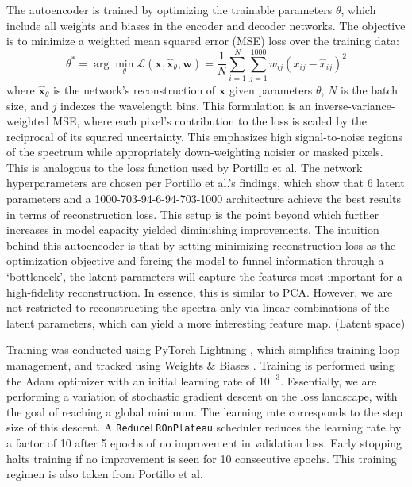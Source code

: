 \documentclass[11pt]{article}
\begin{document}
The autoencoder is trained by optimizing the trainable parameters $\theta$, which include all weights and biases in the encoder and decoder networks. The objective is to minimize a weighted mean squared error (MSE) loss over the training data:
\begin{equation}
\theta^* = \arg\min_\theta \mathcal{L}(\mathbf{x}, \hat{\mathbf{x}}_\theta, \mathbf{w}) = \frac{1}{N} \sum_{i=1}^{N} \sum_{j=1}^{1000} w_{ij} (x_{ij} - \hat{x}_{ij})^2
\end{equation}
where $\hat{\mathbf{x}}_\theta$ is the network’s reconstruction of $\mathbf{x}$ given parameters $\theta$, $N$ is the batch size, and $j$ indexes the wavelength bins. This formulation is an inverse-variance-weighted MSE, where each pixel's contribution to the loss is scaled by the reciprocal of its squared uncertainty. This emphasizes high signal-to-noise regions of the spectrum while appropriately down-weighting noisier or masked pixels. This is analogous to the loss function used by Portillo et al. The network hyperparameters are chosen per Portillo et al.'s findings, which show that 6 latent parameters and a 1000-703-94-6-94-703-1000 architecture achieve the best results in terms of reconstruction loss. This setup is the point beyond which further increases in model capacity yielded diminishing improvements. The intuition behind this autoencoder is that by setting minimizing reconstruction loss as the optimization objective and forcing the model to funnel information through a `bottleneck', the latent parameters will capture the features most important for a high-fidelity reconstruction. In essence, this is similar to PCA. However, we are not restricted to reconstructing the spectra only via linear combinations of the latent parameters, which can yield a more interesting feature map. (Latent space)

Training was conducted using PyTorch Lightning \citep{Falcon2019}, which simplifies training loop management, and tracked using Weights \& Biases \citep{Biewald2020}. Training is performed using the Adam optimizer \citep{adam} with an initial learning rate of $10^{-3}$. Essentially, we are performing a variation of stochastic gradient descent on the loss landscape, with the goal of reaching a global minimum. The learning rate corresponds to the step size of this descent. A \texttt{ReduceLROnPlateau} scheduler reduces the learning rate by a factor of 10 after 5 epochs of no improvement in validation loss. Early stopping halts training if no improvement is seen for 10 consecutive epochs. This training regimen is also taken from Portillo et al.
\end{document}
